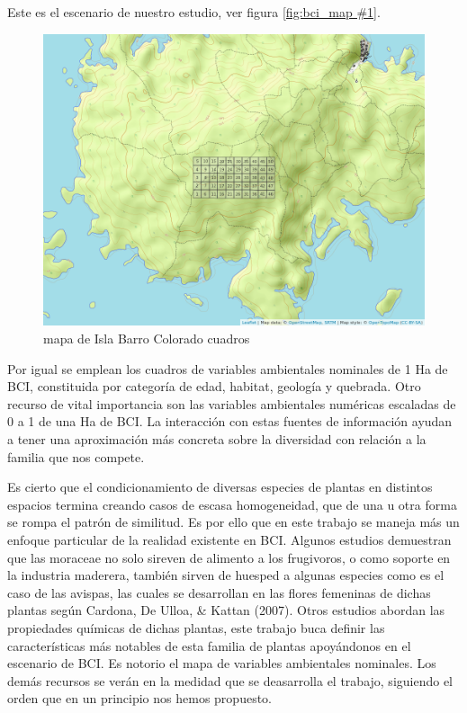 \documentclass[11pt,]{article}
\begin{document}
Este es el escenario de nuestro estudio, ver figura
\ref{fig:bci_map #1}.

\begin{figure}
\centering
\includegraphics[width=1.00000\textwidth]{mapa_cuadros.png}
\caption{mapa de Isla Barro Colorado cuadros\label{fig:bci_map}}
\end{figure}

Por igual se emplean los cuadros de variables ambientales nominales de 1
Ha de BCI, constituida por categoría de edad, habitat, geología y
quebrada. Otro recurso de vital importancia son las variables
ambientales numéricas escaladas de 0 a 1 de una Ha de BCI. La
interacción con estas fuentes de información ayudan a tener una
aproximación más concreta sobre la diversidad con relación a la familia
que nos compete.

Es cierto que el condicionamiento de diversas especies de plantas en
distintos espacios termina creando casos de escasa homogeneidad, que de
una u otra forma se rompa el patrón de similitud. Es por ello que en
este trabajo se maneja más un enfoque particular de la realidad
existente en BCI. Algunos estudios demuestran que las moraceae no solo
sireven de alimento a los frugivoros, o como soporte en la industria
maderera, también sirven de huesped a algunas especies como es el caso
de las avispas, las cuales se desarrollan en las flores femeninas de
dichas plantas según Cardona, De Ulloa, \& Kattan (2007). Otros estudios
abordan las propiedades químicas de dichas plantas, este trabajo buca
definir las características más notables de esta familia de plantas
apoyándonos en el escenario de BCI. Es notorio el mapa de variables
ambientales nominales. Los demás recursos se verán en la medidad que se
deasarrolla el trabajo, siguiendo el orden que en un principio nos hemos
propuesto.
\end{document}
